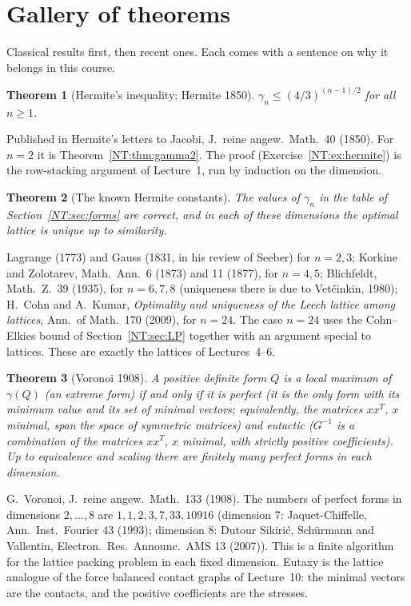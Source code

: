 \documentclass[11pt,openany]{book}
\theoremstyle{plain}
\newtheorem{theorem}{Theorem}[chapter]
\theoremstyle{definition}
\theoremstyle{remark}
\begin{document}
\section{Gallery of theorems}
\label{NT:sec:gallery}

Classical results first, then recent ones. Each comes with a sentence on why it belongs in this course.

\begin{theorem}[Hermite's inequality; Hermite 1850]\label{NT:gal:hermite}
$\gamma_n\le(4/3)^{(n-1)/2}$ for all $n\ge1$.
\end{theorem}
Published in Hermite's letters to Jacobi, J.\ reine angew.\ Math.\ 40 (1850). For $n=2$ it is
Theorem~\ref{NT:thm:gamma2}. The proof (Exercise~\ref{NT:ex:hermite}) is the row-stacking argument of
Lecture~1, run by induction on the dimension.

\begin{theorem}[The known Hermite constants]\label{NT:gal:hermiteknown}
The values of $\gamma_n$ in the table of Section~\ref{NT:sec:forms} are correct, and in each of these
dimensions the optimal lattice is unique up to similarity.
\end{theorem}
Lagrange (1773) and Gauss (1831, in his review of Seeber) for $n=2,3$; Korkine and Zolotarev, Math.\
Ann.\ 6 (1873) and 11 (1877), for $n=4,5$; Blichfeldt, Math.\ Z.\ 39 (1935), for $n=6,7,8$ (uniqueness
there is due to Vet\v{c}inkin, 1980); H.~Cohn and A.~Kumar, \emph{Optimality and uniqueness of the Leech
lattice among lattices}, Ann.\ of Math.\ 170 (2009), for $n=24$. The case $n=24$ uses the Cohn--Elkies
bound of Section~\ref{NT:sec:LP} together with an argument special to lattices. These are exactly the
lattices of Lectures~4--6.

\begin{theorem}[Voronoi 1908]\label{NT:gal:voronoi}
A positive definite form $Q$ is a local maximum of $\gamma(Q)$ (an \emph{extreme} form) if and only if it is
\emph{perfect} (it is the only form with its minimum value and its set of minimal vectors; equivalently,
the matrices $xx^T$, $x$ minimal, span the space of symmetric matrices) and \emph{eutactic} ($G^{-1}$ is a
combination of the matrices $xx^T$, $x$ minimal, with strictly positive coefficients). Up to equivalence and scaling there are finitely many perfect forms in each dimension.
\end{theorem}
G.~Voronoi, J.\ reine angew.\ Math.\ 133 (1908). The numbers of perfect forms in dimensions $2,\dots,8$
are $1,1,2,3,7,33,10916$ (dimension $7$: Jaquet-Chiffelle, Ann.\ Inst.\ Fourier 43 (1993); dimension $8$:
Dutour Sikiri\'c, Schürmann and Vallentin, Electron.\ Res.\ Announc.\ AMS 13 (2007)). This is a finite
algorithm for the lattice packing problem in each fixed dimension. Eutaxy is the lattice analogue of the
force balanced contact graphs of Lecture~10: the minimal vectors are the contacts, and the positive coefficients are
the stresses.
\end{document}
